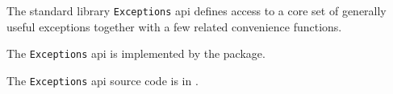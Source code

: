 
The standard library {\tt Exceptions} api defines access to a core set of generally useful exceptions 
together with a few related convenience functions.

The {\tt Exceptions} api is implemented by the  package.

The {\tt Exceptions} api source code is in .





